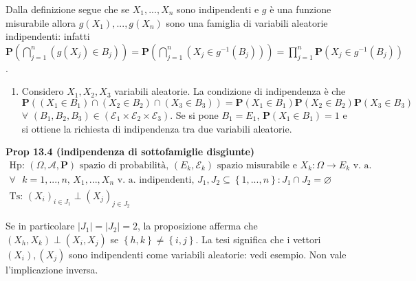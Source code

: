 \documentclass{article}
\begin{document}
Dalla definizione segue che se $X_{1},...,X_{n}$ sono indipendenti e $g$ 
\`{e} una funzione misurabile allora $g\left( X_{1}\right) ,...,g\left(
X_{n}\right) $ sono una famiglia di variabili aleatorie indipendenti:
infatti $\mathbf{P}\left( \bigcap_{j=1}^{n}\left( g\left( X_{j}\right) \in
B_{j}\right) \right) =\mathbf{P}\left( \bigcap_{j=1}^{n}\left( X_{j}\in
g^{-1}\left( B_{j}\right) \right) \right) =\prod_{j=1}^{n}\mathbf{P}\left(
X_{j}\in g^{-1}\left( B_{j}\right) \right) $.

\begin{enumerate}
\item Considero $X_{1},X_{2},X_{3}$ variabili aleatorie. La condizione di
indipendenza \`{e} che $\mathbf{P}\left( \left( X_{1}\in B_{1}\right) \cap
\left( X_{2}\in B_{2}\right) \cap \left( X_{3}\in B_{3}\right) \right) =%
\mathbf{P}\left( X_{1}\in B_{1}\right) \mathbf{P}\left( X_{2}\in
B_{2}\right) \mathbf{P}\left( X_{3}\in B_{3}\right) $ $\forall $ $\left(
B_{1},B_{2},B_{3}\right) \in \left( \mathcal{E}_{1}\times \mathcal{E}%
_{2}\times \mathcal{E}_{3}\right) $. Se si pone $B_{1}=E_{1}$, $\mathbf{P}%
\left( X_{1}\in B_{1}\right) =1$ e si ottiene la richiesta di indipendenza
tra due variabili aleatorie.
\end{enumerate}

\textbf{Prop 13.4 (indipendenza di sottofamiglie disgiunte)}%
\begin{gather*}
\text{Hp: }\left( \Omega ,\mathcal{A},\mathbf{P}\right) \text{ spazio di
probabilit\`{a}, }\left( E_{k},\mathcal{E}_{k}\right) \text{ spazio
misurabile e }X_{k}:\Omega \rightarrow E_{k}\text{ v. a. } \\
\forall \text{ }k=1,...,n\text{, }X_{1},...,X_{n}\text{ v. a. indipendenti, }%
J_{1},J_{2}\subseteq \left\{ 1,...,n\right\} :J_{1}\cap J_{2}=\varnothing \\
\text{Ts: }\left( X_{i}\right) _{i\in J_{1}}\perp \left( X_{j}\right) _{j\in
J_{2}}
\end{gather*}

Se in particolare $\left\vert J_{1}\right\vert =\left\vert J_{2}\right\vert
=2$, la proposizione afferma che $\left( X_{h},X_{k}\right) \perp \left(
X_{i},X_{j}\right) $ se $\left\{ h,k\right\} \neq \left\{ i,j\right\} $. La
tesi significa che i vettori $\left( X_{i}\right) ,\left( X_{j}\right) $
sono indipendenti come variabili aleatorie: vedi esempio. Non vale
l'implicazione inversa.
\end{document}
